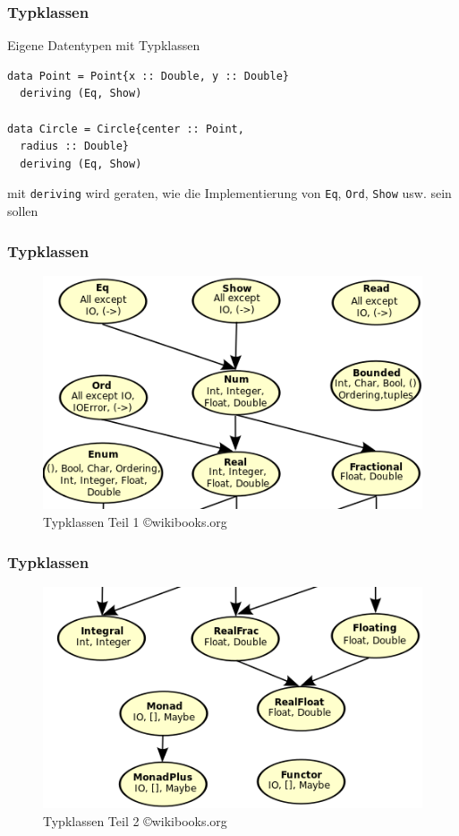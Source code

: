 \documentclass[fleqn,11pt,aspectratio=43]{beamer}
\begin{document}
\begin{frame}[fragile]
\frametitle{Typklassen}
\begin{block}{Eigene Datentypen mit Typklassen}
\begin{lstlisting}
data Point = Point{x :: Double, y :: Double}
  deriving (Eq, Show)

data Circle = Circle{center :: Point, 
  radius :: Double}
  deriving (Eq, Show)
\end{lstlisting}
mit \lstinline|deriving| wird geraten, wie die Implementierung von \lstinline|Eq|, \lstinline|Ord|, \lstinline|Show| usw. sein sollen
\end{block}
\end{frame}

\begin{frame}[fragile]
\frametitle{Typklassen}
\begin{figure}
\includegraphics[scale=0.75]{images/Classes1.png}
\caption{Typklassen Teil 1 \copyright wikibooks.org}
\end{figure}
\end{frame}

\begin{frame}[fragile]
\frametitle{Typklassen}
\begin{figure}
\includegraphics[scale=0.75]{images/Classes2.png}
\caption{Typklassen Teil 2 \copyright wikibooks.org}
\end{figure}
\end{frame}
\end{document}
